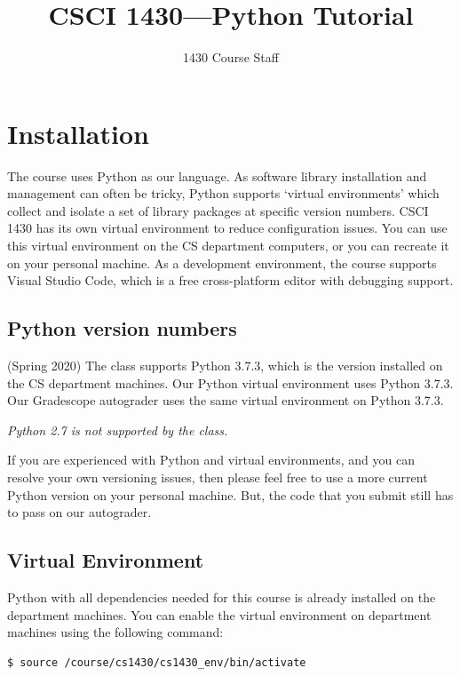 \documentclass{article}
\date{}
\title{CSCI 1430---Python Tutorial}
\author{1430 Course Staff}
\begin{document}
\maketitle
\vspace{-2cm}
\thispagestyle{fancy}

\section{Installation}

The course uses Python as our language. As software library installation and management can often be tricky, Python supports `virtual environments' which collect and isolate a set of library packages at specific version numbers. CSCI 1430 has its own virtual environment to reduce configuration issues. You can use this virtual environment on the CS department computers, or you can recreate it on your personal machine. As a development environment, the course supports Visual Studio Code, which is a free cross-platform editor with debugging support.


\subsection{Python version numbers}

(Spring 2020) The class supports Python 3.7.3, which is the version installed on the CS department machines. Our Python virtual environment uses Python 3.7.3. Our Gradescope autograder uses the same virtual environment on Python 3.7.3.

\emph{Python 2.7 is not supported by the class.}

If you are experienced with Python and virtual environments, and you can resolve your own versioning issues, then please feel free to use a more current Python version on your personal machine. But, the code that you submit still has to pass on our autograder.


\subsection{Virtual Environment}

Python with all dependencies needed for this course is already installed on the department machines. You can enable the virtual environment on department machines using the following command:
\begin{verbatim}
$ source /course/cs1430/cs1430_env/bin/activate
\end{verbatim}
\end{document}
